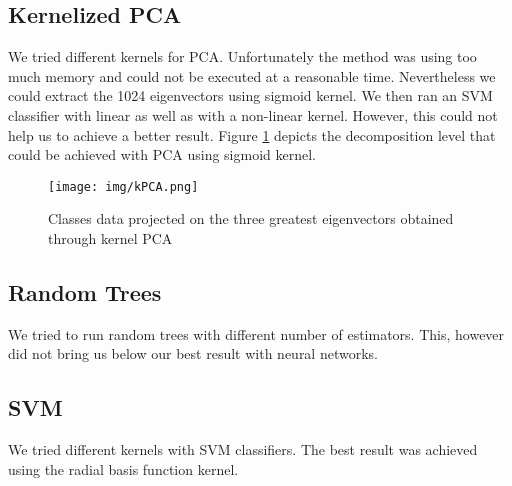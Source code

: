 \documentclass[a4paper, 11pt]{article}
\begin{document}
\subsection{Kernelized PCA}

We tried different kernels for PCA. Unfortunately the method was using too much memory and could not be executed at a reasonable time. Nevertheless we could extract the 1024 eigenvectors using sigmoid kernel. We then ran an SVM classifier with linear as well as with a non-linear kernel. However, this could not help us to achieve a better result. Figure \ref{fig:kPCA} depicts the decomposition level that could be achieved with PCA using sigmoid kernel.

\begin{figure}[h]
\texttt{[image: img/kPCA.png]} 
\caption{Classes data projected on the three greatest eigenvectors obtained through kernel PCA} 
\label{fig:kPCA}
\end{figure}




\subsection{Random Trees}

We tried to run random trees with different number of estimators. This, however did not bring us below our best result with neural networks.

\subsection{SVM}
We tried different kernels with SVM classifiers. The best result was achieved using the radial basis function kernel. 
\end{document}
